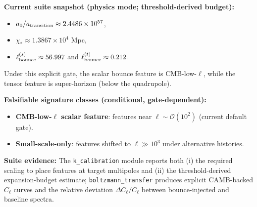 \begin{tcolorbox}[colback=yellow!3, colframe=yellow!60!black,
    title={\textbf{What is deterministic vs.\ what is still policy}}, fonttitle=\bfseries\small]
\textbf{Current suite snapshot (physics mode; threshold-derived budget):}
\begin{itemize}[leftmargin=1.5em, topsep=2pt, itemsep=1pt]
    \item $a_0/a_{\rm transition}\approx 2.4486\times 10^{57}$,
    \item $\chi_*\approx 1.3867\times 10^4$ Mpc,
    \item $\ell^{(s)}_{\rm bounce}\approx 56.997$ and $\ell^{(t)}_{\rm bounce}\approx 0.212$.
\end{itemize}
Under this explicit gate, the scalar bounce feature is CMB-low-$\ell$, while the tensor feature is super-horizon (below the quadrupole). 

\textbf{Falsifiable signature classes (conditional, gate-dependent):}
\begin{itemize}[leftmargin=1.5em, topsep=2pt, itemsep=1pt]
    \item \textbf{CMB-low-$\ell$ scalar feature}: features near $\ell\sim\mathcal{O}(10^2)$ (current default gate).
    \item \textbf{Small-scale-only}: features shifted to $\ell\gg 10^3$ under alternative histories.
\end{itemize}

\textbf{Suite evidence:} The \texttt{k\_calibration} module reports both (i) the required scaling to place features at target multipoles and (ii) the threshold-derived expansion-budget estimate; \texttt{boltzmann\_transfer} produces explicit CAMB-backed $C_\ell$ curves and the relative deviation $\Delta C_\ell/C_\ell$ between bounce-injected and baseline spectra.
\end{tcolorbox}

\TFPTkCalibrationTable

